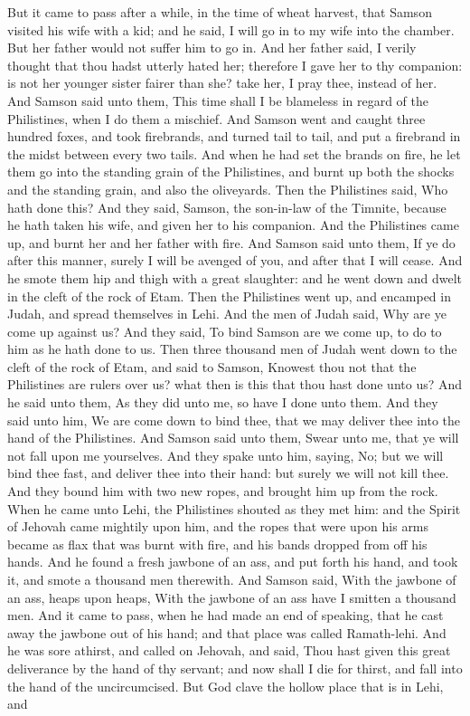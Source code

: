But it came to pass after a while, in the time of wheat harvest, that Samson visited his wife with a kid; and he said, I will go in to my wife into the chamber. But her father would not suffer him to go in. And her father said, I verily thought that thou hadst utterly hated her; therefore I gave her to thy companion: is not her younger sister fairer than she? take her, I pray thee, instead of her. And Samson said unto them, This time shall I be blameless in regard of the Philistines, when I do them a mischief. And Samson went and caught three hundred foxes, and took firebrands, and turned tail to tail, and put a firebrand in the midst between every two tails. And when he had set the brands on fire, he let them go into the standing grain of the Philistines, and burnt up both the shocks and the standing grain, and also the oliveyards. Then the Philistines said, Who hath done this? And they said, Samson, the son-in-law of the Timnite, because he hath taken his wife, and given her to his companion. And the Philistines came up, and burnt her and her father with fire. And Samson said unto them, If ye do after this manner, surely I will be avenged of you, and after that I will cease. And he smote them hip and thigh with a great slaughter: and he went down and dwelt in the cleft of the rock of Etam.  Then the Philistines went up, and encamped in Judah, and spread themselves in Lehi. And the men of Judah said, Why are ye come up against us? And they said, To bind Samson are we come up, to do to him as he hath done to us. Then three thousand men of Judah went down to the cleft of the rock of Etam, and said to Samson, Knowest thou not that the Philistines are rulers over us? what then is this that thou hast done unto us? And he said unto them, As they did unto me, so have I done unto them. And they said unto him, We are come down to bind thee, that we may deliver thee into the hand of the Philistines. And Samson said unto them, Swear unto me, that ye will not fall upon me yourselves. And they spake unto him, saying, No; but we will bind thee fast, and deliver thee into their hand: but surely we will not kill thee. And they bound him with two new ropes, and brought him up from the rock.  When he came unto Lehi, the Philistines shouted as they met him: and the Spirit of Jehovah came mightily upon him, and the ropes that were upon his arms became as flax that was burnt with fire, and his bands dropped from off his hands. And he found a fresh jawbone of an ass, and put forth his hand, and took it, and smote a thousand men therewith. And Samson said, With the jawbone of an ass, heaps upon heaps, With the jawbone of an ass have I smitten a thousand men.  And it came to pass, when he had made an end of speaking, that he cast away the jawbone out of his hand; and that place was called Ramath-lehi. And he was sore athirst, and called on Jehovah, and said, Thou hast given this great deliverance by the hand of thy servant; and now shall I die for thirst, and fall into the hand of the uncircumcised. But God clave the hollow place that is in Lehi, and 